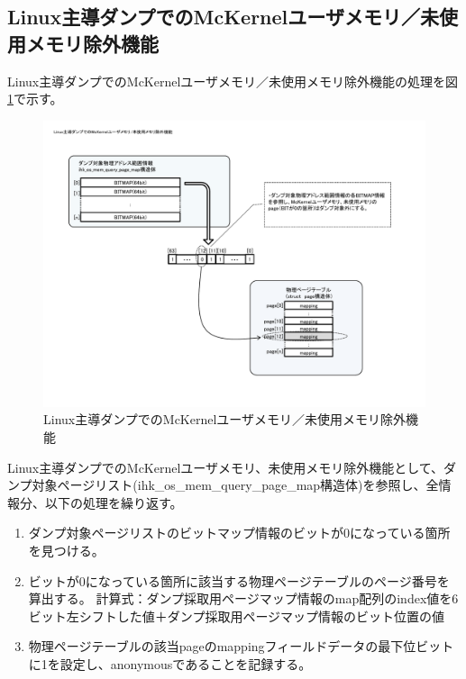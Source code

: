 \documentclass[twoside,11pt,fleqn]{book}
\begin{document}
{\subsection{Linux主導ダンプでのMcKernelユーザメモリ／未使用メモリ除外機能}\label{sec:mckernel_memory_exclusion}

Linux主導ダンプでのMcKernelユーザメモリ／未使用メモリ除外機能の処理を図\ref{figure:chap01_fig012}で示す。\newline
\begin{figure}[!ht]
  \includegraphics[scale=0.6]{figs/chap01_fig012.pdf}
  \caption{Linux主導ダンプでのMcKernelユーザメモリ／未使用メモリ除外機能}
  \label{figure:chap01_fig012}
\end{figure}
\FloatBarrier

Linux主導ダンプでのMcKernelユーザメモリ、未使用メモリ除外機能として、ダンプ対象ページリスト(ihk\_os\_mem\_query\_page\_map構造体)を参照し、全情報分、以下の処理を繰り返す。\newline
\begin{enumerate}
\item ダンプ対象ページリストのビットマップ情報のビットが0になっている箇所を見つける。
\item ビットが0になっている箇所に該当する物理ページテーブルのページ番号を算出する。\newline
計算式：ダンプ採取用ページマップ情報のmap配列のindex値を6ビット左シフトした値＋ダンプ採取用ページマップ情報のビット位置の値
\item 物理ページテーブルの該当pageのmappingフィールドデータの最下位ビットに1を設定し、anonymousであることを記録する。\newline
\end{enumerate}
}
\end{document}

